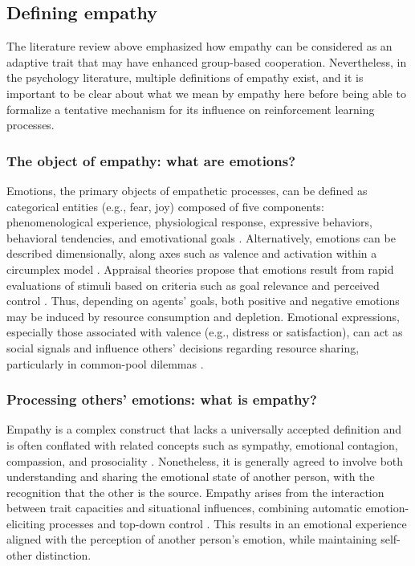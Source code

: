 \subsection{Defining empathy}
The literature review above emphasized how empathy can be considered as an adaptive trait that may have enhanced group-based cooperation. Nevertheless, in the psychology literature, multiple definitions of empathy exist, and it is important to be clear about what we mean by empathy here before being able to formalize a tentative mechanism for its influence on reinforcement learning processes.

\subsubsection{The object of empathy: what are emotions?}
Emotions, the primary objects of empathetic processes, can be defined as categorical entities (e.g., fear, joy) composed of five components: phenomenological experience, physiological response, expressive behaviors, behavioral tendencies, and emotivational goals \cite{rosemanEmotionalBehaviorsEmotivational2011}. Alternatively, emotions can be described dimensionally, along axes such as valence and activation within a circumplex model \cite{russellCoreAffectPsychological2003,rosemanEmotionalBehaviorsEmotivational2011}. Appraisal theories propose that emotions result from rapid evaluations of stimuli based on criteria such as goal relevance and perceived control \cite{broschCommentAppraisingBrain2013,moorsPowerGoalDirectedProcesses2017}. Thus, depending on agents' goals, both positive and negative emotions may be induced by resource consumption and depletion. Emotional expressions, especially those associated with valence (e.g., distress or satisfaction), can act as social signals and influence others' decisions regarding resource sharing, particularly in common-pool dilemmas \cite{lynneTheoreticalFoundationEmpathy2016}.

\subsubsection{Processing others' emotions: what is empathy?}
Empathy is a complex construct that lacks a universally accepted definition and is often conflated with related concepts such as sympathy, emotional contagion, compassion, and prosociality \cite{cuffEmpathyReviewConcept2016}. Nonetheless, it is generally agreed to involve both understanding and sharing the emotional state of another person, with the recognition that the other is the source. Empathy arises from the interaction between trait capacities and situational influences, combining automatic emotion-eliciting processes and top-down control \cite{cuffEmpathyReviewConcept2016}. This results in an emotional experience aligned with the perception of another person's emotion, while maintaining self-other distinction.

